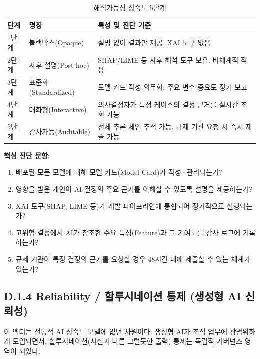 \begin{table}[htbp]
\centering
\caption{해석가능성 성숙도 5단계}
\label{tab:interpretability_maturity}
\begin{tabularx}{\textwidth}{|l|l|X|}
\hline
\textbf{단계} & \textbf{명칭} & \textbf{특성 및 진단 기준} \\ \hline
1단계 & 블랙박스(Opaque) & 설명 없이 결과만 제공. XAI 도구 없음 \\ \hline
2단계 & 사후 설명(Post-hoc) & SHAP/LIME 등 사후 해석 도구 보유. 비체계적 적용 \\ \hline
3단계 & 표준화(Standardized) & 모델 카드 작성 의무화. 주요 변수 중요도 정기 보고 \\ \hline
4단계 & 대화형(Interactive) & 의사결정자가 특정 케이스의 결정 근거를 실시간 조회 가능 \\ \hline
5단계 & 감사가능(Auditable) & 전체 추론 체인 추적 가능. 규제 기관 요청 시 즉시 제출 가능 \\ \hline
\end{tabularx}
\end{table}

\textbf{핵심 진단 문항}:
\begin{enumerate}
    \item 배포된 모든 모델에 대해 모델 카드(Model Card)가 작성·관리되는가?
    \item 영향을 받은 개인이 AI 결정의 주요 근거를 이해할 수 있도록 설명을 제공하는가?
    \item XAI 도구(SHAP, LIME 등)가 개발 파이프라인에 통합되어 정기적으로 실행되는가?
    \item 고위험 결정에서 AI가 참조한 주요 특성(Feature)과 그 기여도를 감사 로그에 기록하는가?
    \item 규제 기관이 특정 결정의 근거를 요청할 경우 48시간 내에 제출할 수 있는 체계가 있는가?
\end{enumerate}

\subsection*{D.1.4 Reliability / 할루시네이션 통제 (생성형 AI 신뢰성)}

이 벡터는 전통적 AI 성숙도 모델에 없던 차원이다. 생성형 AI가 조직 업무에 광범위하게 도입되면서, 할루시네이션(사실과 다른 그럴듯한 출력) 통제는 독립적 거버넌스 영역이 되었다.

